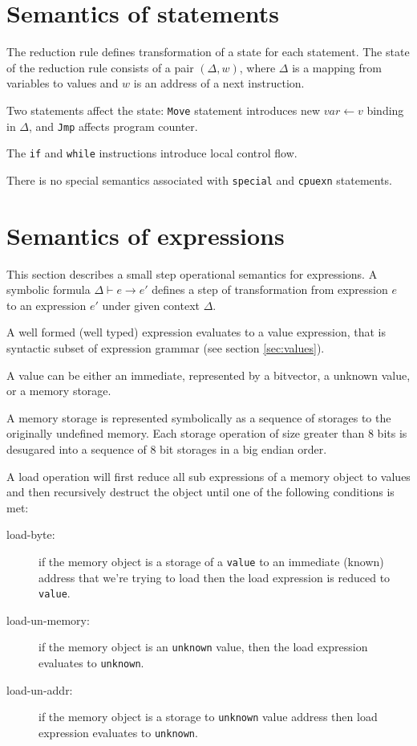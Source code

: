 \documentclass[11pt]{article}
\begin{document}
\section{Semantics of statements}
\label{sec:sema:stmt}

The reduction rule defines transformation of a state for each
statement. The state of the reduction rule consists of a pair
$(\Delta,w)$, where $\Delta$ is a mapping from variables to values and
$w$ is an address of a next instruction.

Two statements affect the state: \verb|Move| statement introduces new
$var \leftarrow v$ binding in $\Delta$, and \verb|Jmp| affects
program counter.

The \verb|if| and \verb|while| instructions introduce local control
flow.

There is no special semantics associated with \verb|special| and
\verb|cpuexn| statements.

\ottdefnsreduceXXstmt


\section {Semantics of expressions}
\label{sec:sema:exp}

This section describes a small step operational semantics for
expressions. A symbolic formula $\Delta \vdash e \rightarrow e' $
defines a step of transformation from expression $e$ to an expression
$e'$ under given context $\Delta$.

A well formed (well typed) expression evaluates to a value expression,
that is syntactic subset of expression grammar (see
section \ref{sec:values}).

A value can be either an immediate, represented by a bitvector, a
unknown value, or a memory storage.

A memory storage is represented symbolically as a sequence of
storages to the originally undefined memory. Each storage
operation of size greater than 8 bits is desugared into a sequence of
8 bit storages in a big endian order.

A load operation will first reduce all sub expressions of a memory
object to values and then recursively destruct the object until one of
the following conditions is met:


\begin{description}
\item[load-byte:] if the memory object is a storage of a \verb|value|
  to an immediate (known) address that we're trying to load then the
  load expression is reduced to \verb|value|.
\item[load-un-memory:] if the memory object is an \verb|unknown| value,
  then the load expression evaluates to \verb|unknown|.
\item[load-un-addr:] if the memory object is a storage to
  \verb|unknown| value address then load expression evaluates to
  \verb|unknown|.
\end{description}
\end{document}
